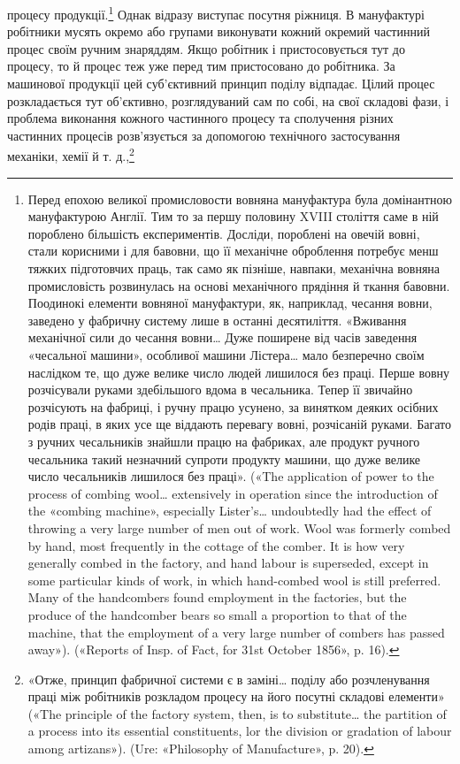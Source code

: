 процесу продукції.\footnote{
Перед епохою великої промисловости вовняна мануфактура була
домінантною мануфактурою Англії. Тим то за першу половину XVIII століття
саме в ній пороблено більшість експериментів. Досліди, пороблені
на овечій вовні, стали корисними і для бавовни, що її механічне
оброблення потребує менш тяжких підготовчих праць, так само як пізніше,
навпаки, механічна вовняна промисловість розвинулась на основі
механічного прядіння й ткання бавовни. Поодинокі елементи вовняної
мануфактури, як, наприклад, чесання вовни, заведено у фабричну систему
лише в останні десятиліття. «Вживання механічної сили до чесання вовни\dots{}
Дуже поширене від часів заведення «чесальної машини», особливої машини
Лістера\dots{} мало безперечно своїм наслідком те, що дуже велике число
людей лишилося без праці. Перше вовну розчісували руками здебільшого
вдома в чесальника. Тепер її звичайно розчісують на фабриці, і ручну
працю усунено, за винятком деяких осібних родів праці, в яких усе ще віддають
перевагу вовні, розчісаній руками. Багато з ручних чесальників
знайшли працю на фабриках, але продукт ручного чесальника такий незначний
супроти продукту машини, що дуже велике число чесальників
лишилося без праці». («The application of power to the process of combing
wool\dots{} extensively in operation since the introduction of the «combing
machine», especially Lister’s\dots{} undoubtedly had the effect of throwing
a very large number of men out of work. Wool was formerly combed by
hand, most frequently in the cottage of the comber. It is how very generally
combed in the factory, and hand labour is superseded, except in some particular
kinds of work, in which hand-combed wool is still preferred. Many
of the handcombers found employment in the factories, but the produce of
the handcomber bears so small a proportion to that of the machine, that
the employment of a very large number of combers has passed away»). («Reports
of Insp. of Fact, for 31st October 1856», p. 16).
} Однак відразу виступає посутня ріжниця.
В мануфактурі робітники мусять окремо або групами виконувати
кожний окремий частинний процес своїм ручним знаряддям.
Якщо робітник і пристосовується тут до процесу, то й процес
теж уже перед тим пристосовано до робітника. За машинової
продукції цей суб’єктивний принцип поділу відпадає. Цілий
процес розкладається тут об’єктивно, розглядуваний сам по собі,
на свої складові фази, і проблема виконання кожного частинного
процесу та сполучення різних частинних процесів розв’язується
за допомогою технічного застосування механіки, хемії й т. д.,\footnote{
«Отже, принцип фабричної системи є в заміні\dots{} поділу або розчленування
праці між робітників розкладом процесу на його посутні
складові елементи» («The principle of the factory system, then, is to substitute\dots{}
the partition of a process into its essential constituents, lor the
division or gradation of labour among artizans»). (Ure: «Philosophy of
Manufacture», p. 20).
}
